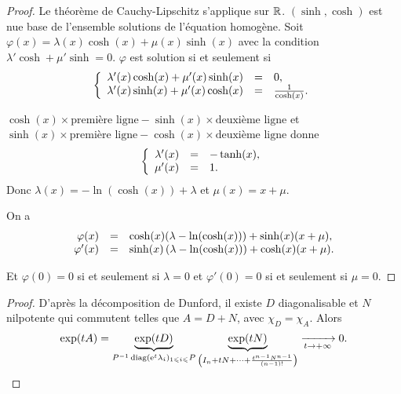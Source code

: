 \documentclass[12pt]{article}
\begin{document}
\begin{proof}
	Le théorème de Cauchy-Lipschitz s'applique sur $\mathbb{R}$. $(\sinh,\cosh)$ est nue base de l'ensemble solutions de l'équation homogène. Soit $\varphi(x)=\lambda(x)\cosh(x)+\mu(x)\sinh(x)$ avec la condition $\lambda'\cosh+\mu'\sinh=0$. $\varphi$ est solution si et seulement si 
	\begin{equation*}
		\left\lbrace
			\begin{array}[]{rcl}
				\lambda'(x)\cosh(x)+\mu'(x)\sinh(x) &=&0,\\
				\lambda'(x)\sinh(x)+\mu'(x)\cosh(x) &=&\frac{1}{\cosh(x)}.
			\end{array}
		\right.
	\end{equation*}

	$\cosh(x)\times\text{première ligne}-\sinh(x)\times\text{deuxième ligne}$ et $\sinh(x)\times\text{première ligne}-\cosh(x)\times\text{deuxième ligne}$ donne 
	\begin{equation*}
		\left\lbrace
			\begin{array}[]{rcl}
				\lambda'(x) &=& -\tanh(x),\\
				\mu'(x) &=& 1.
			\end{array}
		\right.
	\end{equation*}
	Donc $\lambda(x)=-\ln(\cosh(x))+\lambda$ et $\mu(x)=x+\mu$.

	On a 
	\begin{equation*}
		\begin{array}[]{rcl}
			\varphi(x) &=& \cosh(x)(\lambda-\ln(\cosh(x)))+\sinh(x)(x+\mu),\\
			\varphi'(x) &=& \sinh(x)\left(\lambda-\ln(\cosh(x))\right)+\cosh(x)(x+\mu).
		\end{array}
	\end{equation*}

	Et $\varphi(0)=0$ si et seulement si $\lambda=0$ et $\varphi'(0)=0$ si et seulement si $\mu=0$.
\end{proof}

\begin{proof}
	D'après la décomposition de Dunford, il existe $D$ diagonalisable et $N$ nilpotente qui commutent telles que $A=D+N$, avec $\chi_{D}=\chi_{A}$.
	Alors 
	\begin{equation*}
		\exp(tA)=\underbrace{\exp(tD)}_{P^{-1}\operatorname{diag}(\mathrm{e}^{t}\lambda_i)_{1\leqslant i\leqslant}P}\underbrace{\exp(tN)}_{\left(I_n+tN+\dots+\frac{t^{n-1}N^{n-1}}{(n-1)!}\right)}\xrightarrow[t\to+\infty]{}0.
	\end{equation*}
\end{proof}
\end{document}
